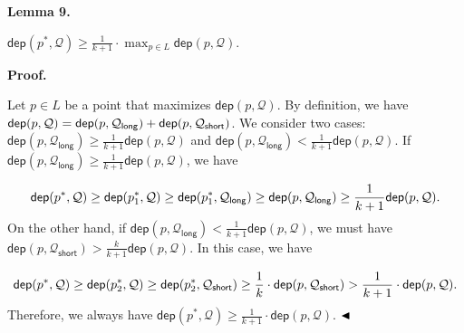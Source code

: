 \documentclass[10pt,a4paper]{article}
\begin{document}
\par
\par
\par\medskip\noindent\textbf{Lemma 9.}\par
$\mathsf{dep}(p^{*},\mathcal{Q})\geq\frac{1}{k+1}\cdot\max_{p\in L}\mathsf{dep}%
(p,\mathcal{Q})$.
\par
\par
\par
\par\medskip\noindent\textbf{Proof.}\par
Let $p\in L$ be a point that maximizes $\mathsf{dep}(p,\mathcal{Q})$. By definition, we have ${\mathsf{dep}}(p,\mathcal{Q})={\mathsf{dep}}(p,\mathcal{Q}_{\mathsf{long}})+{%
\mathsf{dep}}(p,\mathcal{Q}_{\mathsf{short}})$. We consider two cases: ${\mathsf{dep}}(p,\mathcal{Q}_{\mathsf{long}})\geq\frac{1}{k+1}{\mathsf{dep}}(p%
,\mathcal{Q})$ and ${\mathsf{dep}}(p,\mathcal{Q}_{\mathsf{long}})<\frac{1}{k+1}{\mathsf{dep}}(p,%
\mathcal{Q})$. If ${\mathsf{dep}}(p,\mathcal{Q}_{\mathsf{long}})\geq\frac{1}{k+1}{\mathsf{dep}}(p%
,\mathcal{Q})$, we have
\par
\[\begin{aligned}
\mathsf{dep}(p^{*},\mathcal{Q})\geq\mathsf{dep}(p_{1}^{*},\mathcal{Q})\geq{%
\mathsf{dep}}(p_{1}^{*},\mathcal{Q}_{\mathsf{long}})\geq{\mathsf{dep}}(p,%
\mathcal{Q}_{\mathsf{long}})\geq\frac{1}{k+1}{\mathsf{dep}}(p,\mathcal{Q}).
\end{aligned}\]
On the other hand, if ${\mathsf{dep}}(p,\mathcal{Q}_{\mathsf{long}})<\frac{1}{k+1}{\mathsf{dep}}(p,%
\mathcal{Q})$, we must have ${\mathsf{dep}}(p,\mathcal{Q}_{\mathsf{short}})>\frac{k}{k+1}{\mathsf{dep}}(p,%
\mathcal{Q})$. In this case, we have
\par
\[\begin{aligned}
\mathsf{dep}(p^{*},\mathcal{Q})\geq\mathsf{dep}(p_{2}^{*},\mathcal{Q})\geq{%
\mathsf{dep}}(p_{2}^{*},\mathcal{Q}_{\mathsf{short}})\geq\frac{1}{k}\cdot{%
\mathsf{dep}}(p,\mathcal{Q}_{\mathsf{short}})>\frac{1}{k+1}\cdot{\mathsf{dep}}%
(p,\mathcal{Q}).
\end{aligned}\]
Therefore, we always have $\mathsf{dep}(p^{*},\mathcal{Q})\geq\frac{1}{k+1}\cdot{\mathsf{dep}}(p,\mathcal%
{Q})$. $\hfill\blacktriangleleft$
\par
\par
\end{document}
